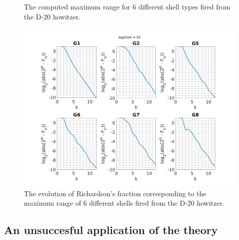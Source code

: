 \documentclass[runningheads]{llncs}
\begin{document}
\begin{figure}
  \centering
  \vgamma
  \caption{The computed maximum range for 6 different shell types fired from the D-20 howitzer.}
  \label{fig:maxrange_rk1_table_tol53} 
\end{figure}

\begin{figure}[t!]
  \centering
  \includegraphics[width=12cm]{maxrange_rk1_tol53.png}
  \caption{The evolution of Richardson's fraction corresponding to the maximum range of 6 different shells fired from the D-20 howitzer.} \label{fig:maxrange_rk1_fraction_tol53}
\end{figure}

\subsection{An unsuccesful application of the theory}
\end{document}
